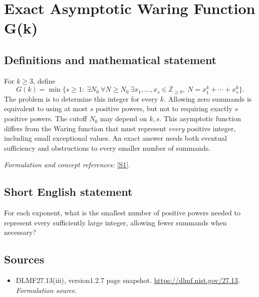 \documentclass[11pt]{article}
\begin{document}
\section*{\texorpdfstring{Exact Asymptotic Waring Function G(k)}{Exact Asymptotic Waring Function G(k)}}\label{200}
\subsection{Definitions and mathematical statement}
For $k\ge3$, define
\[
 G(k)=\min\{s\ge1:\ \exists N_0\ \forall N\ge N_0\
 \exists x_1,\ldots,x_s\in{\mathbb{Z}}_{\ge0},\ N=x_1^k+\cdots+x_s^k\}.
\]
The problem is to determine this integer for every $k$. Allowing zero summands is equivalent to using at most $s$ positive powers, but not to requiring exactly $s$ positive powers. The cutoff $N_0$ may depend on $k,s$. This asymptotic function differs from the Waring function that must represent \emph{every} positive integer, including small exceptional values. An exact answer needs both eventual sufficiency and obstructions to every smaller number of summands.
\par\smallskip\textit{Formulation and concept references:} \href{https://dlmf.nist.gov/27.13}{[S1]}.

\subsection{Short English statement}
For each exponent, what is the smallest number of positive powers needed to represent every sufficiently large integer, allowing fewer summands when necessary?
\subsection{Sources}
\begin{itemize}
\item[S1]DLMF27.13(iii), version1.2.7 page snapshot.
\url{https://dlmf.nist.gov/27.13}.
\textit{Formulation source.}
\end{itemize}
\end{document}

